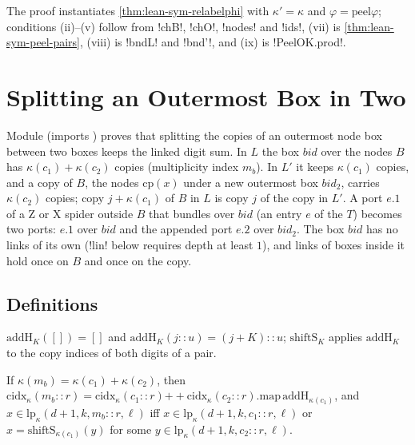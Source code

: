 The proof instantiates \cref{thm:lean-sym-relabelphi} with $\kappa'=\kappa$ and $\varphi=\mathrm{peel}\varphi$; conditions (ii)--(v) follow from \lean!chB!, \lean!chO!, \lean!nodes! and \lean!ids!, (vii) is \cref{thm:lean-sym-peel-pairs}, (viii) is \lean!bndL! and \lean!bnd'!, and (ix) is \lean!PeelOK.prod!.

\section{Splitting an Outermost Box in Two}\label{sec:lean-sym-split}

Module  (imports ) proves that splitting the copies of an outermost node box between two boxes keeps the linked digit sum. In $L$ the box $\mathit{bid}$ over the nodes $B$ has $\kappa(c_1)+\kappa(c_2)$ copies (multiplicity index $m_b$). In $L'$ it keeps $\kappa(c_1)$ copies, and a copy of $B$, the nodes $\mathrm{cp}(x)$ under a new outermost box $\mathit{bid}_2$, carries $\kappa(c_2)$ copies; copy $j+\kappa(c_1)$ of $B$ in $L$ is copy $j$ of the copy in $L'$. A port $e.1$ of a Z or X spider outside $B$ that bundles over $\mathit{bid}$ (an entry $e$ of the  $T$) becomes two ports: $e.1$ over $\mathit{bid}$ and the appended port $e.2$ over $\mathit{bid}_2$. The box $\mathit{bid}$ has no links of its own (\lean!lin! below requires depth at least $1$), and links of boxes inside it hold once on $B$ and once on the copy.

\subsection{Definitions}

\begin{definition}
$\mathrm{addH}_K([])=[]$ and $\mathrm{addH}_K(j\mathbin{::}u)=(j+K)\mathbin{::}u$; $\mathrm{shiftS}_K$ applies $\mathrm{addH}_K$ to the copy indices of both digits of a pair.
\end{definition}

\begin{proposition}
If $\kappa(m_b)=\kappa(c_1)+\kappa(c_2)$, then $\mathrm{cidx}_\kappa(m_b\mathbin{::}r)=\mathrm{cidx}_\kappa(c_1\mathbin{::}r)\mathbin{+\!\!+}\mathrm{cidx}_\kappa(c_2\mathbin{::}r).\mathrm{map}\,\mathrm{addH}_{\kappa(c_1)}$, and $x\in\mathrm{lp}_\kappa(d+1,k,m_b\mathbin{::}r,\ell)$ iff $x\in\mathrm{lp}_\kappa(d+1,k,c_1\mathbin{::}r,\ell)$ or $x=\mathrm{shiftS}_{\kappa(c_1)}(y)$ for some $y\in\mathrm{lp}_\kappa(d+1,k,c_2\mathbin{::}r,\ell)$.
\end{proposition}

